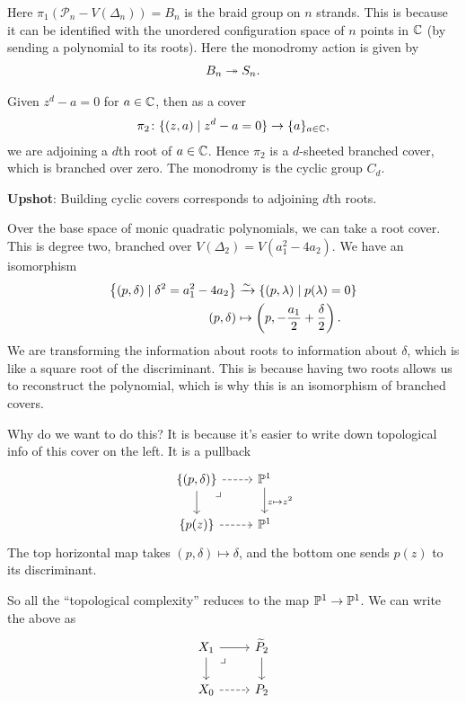 \documentclass[11pt]{amsart}
\let\til\widetilde
\begin{document}
Here $\pi_1(\mathcal{P}_n-V(\Delta_n)) = B_n$ is the braid group on $n$ strands. This is because it can be identified with the unordered configuration space of $n$ points in $\C$ (by sending a polynomial to its roots). Here the monodromy action is given by
\begin{align*}
    B_n \tto S_n.
\end{align*}

\begin{example} Given $z^d - a =0$ for $a\in \C$, then as a cover
\begin{align*}
    \pi_2 \colon \{(z,a) \mid z^d -a = 0\} \to \{a\}_{a\in \C},
\end{align*}
we are adjoining a $d$th root of $a\in \C$. Hence $\pi_2$ is a $d$-sheeted branched cover, which is branched over zero. The monodromy is the cyclic group $C_d$.
\end{example}

\textbf{Upshot}: Building cyclic covers corresponds to adjoining $d$th roots.

\begin{example} Over the base space of monic quadratic polynomials, we can take a root cover. This is degree two, branched over $V(\Delta_2) = V(a_1^2 - 4a_2)$. We have an isomorphism
\begin{align*}
    \left\{ (p,\delta) \mid \delta^2 = a_1^2 - 4a_2 \right\} &\xto{\sim} \left\{ (p,\lambda) \mid p(\lambda) = 0 \right\} \\
    (p,\delta) &\mapsto \left( p, - \frac{a_1}{2} + \frac{\delta}{2} \right).
\end{align*}
We are transforming the information about roots to information about $\delta$, which is like a square root of the discriminant. This is because having two roots allows us to reconstruct the polynomial, which is why this is an isomorphism of branched covers.

Why do we want to do this? It is because it's easier to write down topological info of this cover on the left. It is a pullback
\[ \begin{tikzcd}
    \left\{ (p,\delta) \right\}\rar[dashed]\dar\pb & \P^1\dar["z\mapsto z^2" right]\\
    \left\{ p(z) \right\}\rar[dashed] & \P^1
\end{tikzcd} \]
The top horizontal map takes $(p,\delta) \mapsto \delta$, and the bottom one sends $p(z)$ to its discriminant.
\end{example}

So all the ``topological complexity'' reduces to the map $\P^1 \to \P^1$. We can write the above as
\[ \begin{tikzcd}
    X_1\dar\rar\pb & \til{P}_2\dar\\
    X_0\rar[dashed] & P_2\\
\end{tikzcd} \]
\end{document}
